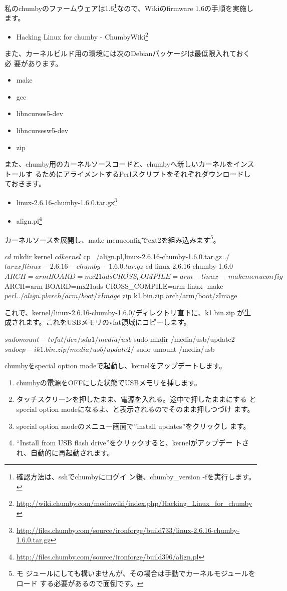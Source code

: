 \documentclass[mingoth,a4paper]{jsarticle}
\begin{document}
私のchumbyのファームウェアは1.6\footnote{確認方法は、sshでchumbyにログイ
ン後、chumby\_version -fを実行します。}なので、Wikiのfirmware 1.6の手順を実施し
ます。
\begin{itemize}
\item Hacking Linux for chumby - ChumbyWiki\footnote{\url{http://wiki.chumby.com/mediawiki/index.php/Hacking_Linux_for_chumby}}
\end{itemize}
また、カーネルビルド用の環境には次のDebianパッケージは最低限入れておく必
要があります。
\begin{itemize}
\item make
\item gcc
\item libncurses5-dev
\item libncursesw5-dev
\item zip
\end{itemize}
また、chumby用のカーネルソースコードと、chumbyへ新しいカーネルをインストールす
るためにアライメントするPerlスクリプトをそれぞれダウンロードしておきます。
\begin{itemize}
\item linux-2.6.16-chumby-1.6.0.tar.gz\footnote{\url{http://files.chumby.com/source/ironforge/build733/linux-2.6.16-chumby-1.6.0.tar.gz}}
\item align.pl\footnote{\url{http://files.chumby.com/source/ironforge/build396/align.pl}}
\end{itemize}

カーネルソースを展開し、make menuconfigでext2を組み込みます\footnote{モ
ジュールにしても構いませんが、その場合は手動でカーネルモジュールをロード
する必要があるので面倒です。}。
\begin{commandline}
$ cd
$ mkdir kernel
$ cd kernel
$ cp ~/{align.pl,linux-2.6.16-chumby-1.6.0.tar.gz} ./
$ tar zxf linux-2.6.16-chumby-1.6.0.tar.gz
$ cd linux-2.6.16-chumby-1.6.0
$ ARCH=arm BOARD=mx21ads CROSS_COMPILE=arm-linux- \
 make menuconfig
$ ARCH=arm BOARD=mx21ads CROSS_COMPILE=arm-linux- make
$ perl ../align.pl arch/arm/boot/zImage
$ zip k1.bin.zip arch/arm/boot/zImage
\end{commandline}
これで、kernel/linux-2.6.16-chumby-1.6.0/ディレクトリ直下に、k1.bin.zip
が生成されます。これをUSBメモリのvfat領域にコピーします。
\begin{commandline}
$ sudo mount -t vfat /dev/sda1 /media/usb
$ sudo mkdir /media/usb/update2
$ sudo cp -i k1.bin.zip /media/usb/update2/
$ sudo umount /media/usb
\end{commandline}
chumbyをspecial option modeで起動し、kernelをアップデートします。
\begin{enumerate}
\item chumbyの電源をOFFにした状態でUSBメモリを挿します。
\item タッチスクリーンを押したまま、電源を入れる。途中で押したままにする
      とspecial option modeになるよ、と表示されるのでそのまま押しつづけ
      ます。
\item special option modeのメニュー画面で''install updates''をクリックし
      ます。
\item ``Install from USB flash drive''をクリックすると、kernelがアップデー
      トされ、自動的に再起動されます。
\end{enumerate}
\end{document}
